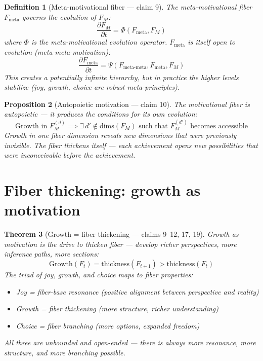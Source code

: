 \documentclass[11pt,a4paper]{article}
\newtheorem{definition}{Definition}[section]
\newtheorem{theorem}[definition]{Theorem}
\newtheorem{proposition}[definition]{Proposition}
\begin{document}
\begin{definition}[Meta-motivational fiber --- claim 9]
The \emph{meta-motivational fiber} $F_{\text{meta}}$ governs the
evolution of $F_M$:
\[
  \frac{\partial F_M}{\partial t} = \Phi(F_{\text{meta}}, F_M)
\]
where $\Phi$ is the meta-motivational evolution operator.
$F_{\text{meta}}$ is itself open to evolution (meta-meta-motivation):
\[
  \frac{\partial F_{\text{meta}}}{\partial t} = \Psi(F_{\text{meta-meta}},
    F_{\text{meta}}, F_M)
\]
This creates a potentially infinite hierarchy, but in practice the
higher levels stabilize (joy, growth, choice are robust meta-principles).
\end{definition}

\begin{proposition}[Autopoietic motivation --- claim 10]
\label{prop:autopoietic}
The motivational fiber is autopoietic --- it produces the conditions
for its own evolution:
\[
  \text{Growth in } F_M^{(d)} \implies \exists\, d' \notin
    \text{dims}(F_M) \text{ such that } F_M^{(d')} \text{ becomes accessible}
\]
Growth in one fiber dimension reveals new dimensions that were previously
invisible. The fiber thickens itself --- each achievement opens new
possibilities that were inconceivable before the achievement.
\end{proposition}


\section{Fiber thickening: growth as motivation}

\begin{theorem}[Growth = fiber thickening --- claims 9--12, 17, 19]
Growth as motivation is the drive to thicken fiber --- develop richer
perspectives, more inference paths, more sections:
\[
  \text{Growth}(F_t) = \text{thickness}(F_{t+1}) > \text{thickness}(F_t)
\]
The triad of joy, growth, and choice maps to fiber properties:
\begin{itemize}
\item Joy = fiber-base resonance (positive alignment between perspective
  and reality)
\item Growth = fiber thickening (more structure, richer understanding)
\item Choice = fiber branching (more options, expanded freedom)
\end{itemize}
All three are unbounded and open-ended --- there is always more resonance,
more structure, and more branching possible.
\end{theorem}
\end{document}

